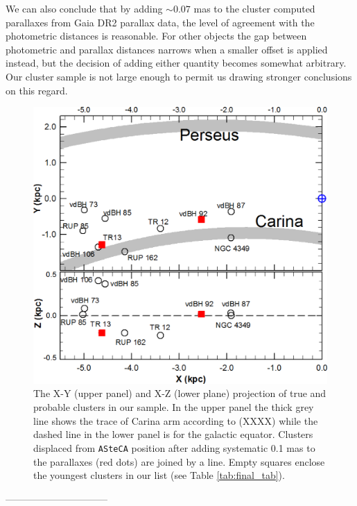\documentclass[draft]{aa}
\begin{document}
We can also conclude that by adding $\sim0.07$ mas to the cluster computed
parallaxes from Gaia DR2 parallax data, the level of agreement with the
photometric distances is reasonable.
For other objects the gap between photometric and parallax distances narrows
when a smaller offset is applied instead, but the decision of
adding either quantity becomes somewhat arbitrary. Our cluster sample is not
large enough to permit us drawing stronger conclusions on this regard.\\


\begin{figure}[ht]
    \centering
    \includegraphics[width=\hsize]{../figs/xy_xz.png}
    \caption{The X-Y (upper panel) and X-Z (lower plane) projection of true and
    probable clusters in our sample. In the upper panel the thick grey line
    shows the trace of Carina arm according to (XXXX) while the dashed line in
    the lower panel is for the galactic equator. Clusters displaced from 
    \texttt{ASteCA} position after adding systematic 0.1 mas to the parallaxes 
    (red dots) are joined by a line. Empty squares enclose the youngest clusters
    in our list (see Table \ref{tab:final_tab}).}
    \label{fig68}
\end{figure}

--------------------------------
\end{document}
